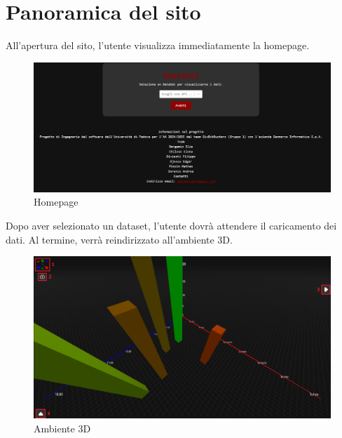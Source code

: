 \section{Panoramica del sito}
All'apertura del sito, l'utente visualizza immediatamente la homepage.
\begin{figure}[h!]
    \centering
    \includegraphics[scale=0.4]{template/images/homepage.png}
    \caption{Homepage}
\end{figure}
\newline
\newline
Dopo aver selezionato un dataset, l'utente dovrà attendere il caricamento dei dati. Al termine, verrà reindirizzato all'ambiente 3D.
\begin{figure}[h!]
    \centering
    \includegraphics[scale=0.4]{template/images/envpage.png}
    \caption{Ambiente 3D}
\end{figure}
